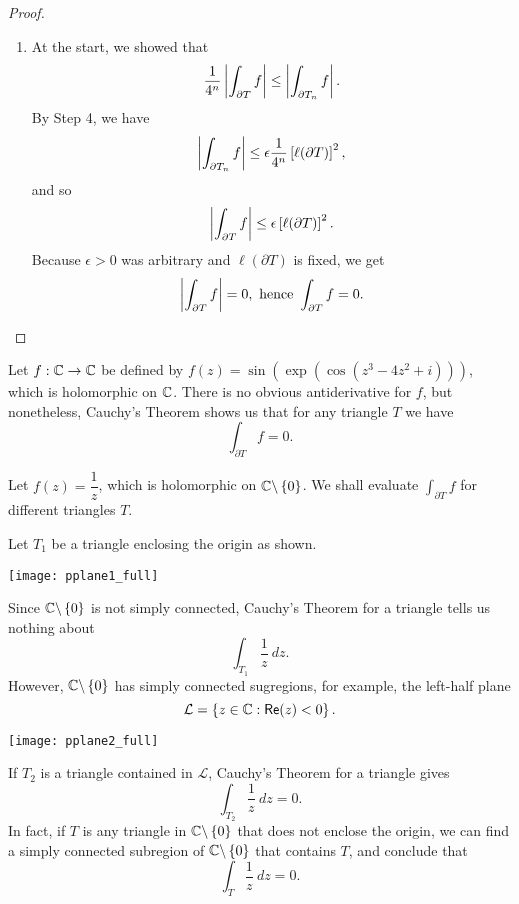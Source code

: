 \begin{proof}
\begin{enumerate}
\item 
At the start, we showed that
\[
\frac{1}{4^n} \left|  \int_{\partial T} f  \right| \leq \left|  \int_{\partial T_n} f \right|.
\]
By Step 4, we have
\[
\left|  \int_{\partial T_n} f  \right| \leq \epsilon \frac{1}{4^n} \left[ \ell ( \partial T) \right]^2,
\]
and so
\[
\left|  \int_{\partial T} f  \right| \leq \epsilon \left[ \ell ( \partial T) \right]^2.
\]
Because $\epsilon>0$ was arbitrary and $\ell ( \partial T)$ is fixed, we get
\[
\left|  \int_{\partial T} f  \right| = 0, \text{ hence } \int_{\partial T} f =0.
\]
\end{enumerate}
\end{proof}


\begin{example}
Let $f:\mathbb{C} \to \mathbb{C}$ be defined by $f(z)=\sin \left( \exp \left( \cos \left( z^3-4z^2+i \right) \right) \right)$, which is holomorphic on $\mathbb{C}$.  There is no obvious antiderivative for $f$, but nonetheless, Cauchy's Theorem shows us that for any triangle $T$ we have
\[
\int_{\partial T} f = 0.
\]
\end{example}
\begin{example}
Let $f(z) = \dfrac{1}{z}$, which is holomorphic on $\mathbb{C} \backslash \left\{0\right\}$.  We shall evaluate $\int_{\partial T} f$ for different triangles $T$.

Let $T_1$ be a triangle enclosing the origin as shown.
\begin{center}
\texttt{[image: pplane1\_full]}
\end{center}
Since $\mathbb{C} \backslash \left\{0\right\}$ is not simply connected, Cauchy's Theorem for a triangle tells us nothing about
\[
\int_{T_1} \frac{1}{z}\ dz.
\]
However, $\mathbb{C} \backslash \left\{0\right\}$ has simply connected sugregions, for example, the left-half plane
\[
\mathcal{L} = \left\{ z \in \mathbb{C} : \textsf{Re} (z) < 0 \right\}.
\]
\begin{center}
\texttt{[image: pplane2\_full]}
\end{center}
If $T_2$ is a triangle contained in $\mathcal{L}$, Cauchy's Theorem for a triangle gives
\[
\int_{T_2} \frac{1}{z}\ dz =0.
\]
In fact, if $T$ is any triangle in $\mathbb{C} \backslash \left\{0\right\}$ that does not enclose the origin, we can find a simply connected subregion of $\mathbb{C} \backslash \left\{0\right\}$ that contains $T$, and conclude that
\[
\int_{T} \frac{1}{z}\ dz =0.
\]




\end{example}
\newpage
